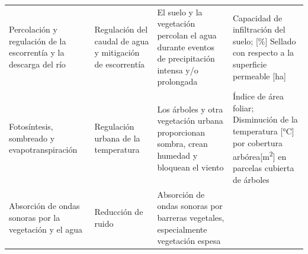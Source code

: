 \documentclass[12pt,a4paper,openany]{book}
\theoremstyle{definition}
\theoremstyle{definition}
\theoremstyle{definition}
\theoremstyle{remark}
\begin{document}
\begin{longtable}[]{@{}llll@{}}
\begin{minipage}[t]{0.26\columnwidth}\raggedright\strut
Percolación y regulación de la escorrentía y la descarga del río\strut
\end{minipage} & \begin{minipage}[t]{0.22\columnwidth}\raggedright\strut
Regulación del caudal de agua y mitigación de escorrentía\strut
\end{minipage} & \begin{minipage}[t]{0.19\columnwidth}\raggedright\strut
El suelo y la vegetación percolan el agua durante eventos de
precipitación intensa y/o prolongada\strut
\end{minipage} & \begin{minipage}[t]{0.22\columnwidth}\raggedright\strut
Capacidad de infiltración del suelo; {[}\%{]} Sellado con respecto a la
superficie permeable {[}ha{]}\strut
\end{minipage}\tabularnewline
\begin{minipage}[t]{0.26\columnwidth}\raggedright\strut
Fotosíntesis, sombreado y evapotranspiración\strut
\end{minipage} & \begin{minipage}[t]{0.22\columnwidth}\raggedright\strut
Regulación urbana de la temperatura\strut
\end{minipage} & \begin{minipage}[t]{0.19\columnwidth}\raggedright\strut
Los árboles y otra vegetación urbana proporcionan sombra, crean humedad
y bloquean el viento\strut
\end{minipage} & \begin{minipage}[t]{0.22\columnwidth}\raggedright\strut
Índice de área foliar; Disminución de la temperatura {[}°C{]} por
cobertura arbórea{[}m\textsuperscript{2}{]} en parcelas cubierta de
árboles\strut
\end{minipage}\tabularnewline
\begin{minipage}[t]{0.26\columnwidth}\raggedright\strut
Absorción de ondas sonoras por la vegetación y el agua\strut
\end{minipage} & \begin{minipage}[t]{0.22\columnwidth}\raggedright\strut
Reducción de ruido\strut
\end{minipage} & \begin{minipage}[t]{0.19\columnwidth}\raggedright\strut
Absorción de ondas sonoras por barreras vegetales, especialmente
vegetación espesa\strut
\end{minipage} & \begin{minipage}[t]{0.22\columnwidth}\raggedright\strut

\end{minipage}
\end{longtable}
\end{document}
